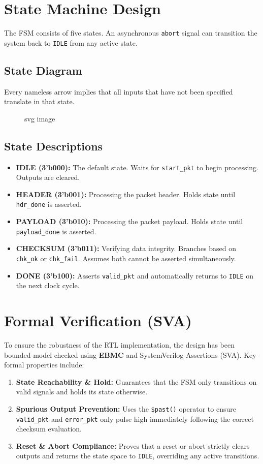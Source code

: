 \section{State Machine Design}
The FSM consists of five states. An asynchronous \texttt{abort} signal can transition the system back to \texttt{IDLE} from any active state. 

\subsection*{State Diagram}
Every nameless arrow implies that all inputs that have not been specified translate in that state.
\begin{figure}[htbp]
  \centering
  
  \caption{svg image}
\end{figure}

\subsection*{State Descriptions}
\begin{itemize}
    \item \textbf{IDLE (3'b000):} The default state. Waits for \texttt{start\_pkt} to begin processing. Outputs are cleared.
    \item \textbf{HEADER (3'b001):} Processing the packet header. Holds state until \texttt{hdr\_done} is asserted.
    \item \textbf{PAYLOAD (3'b010):} Processing the packet payload. Holds state until \texttt{payload\_done} is asserted.
    \item \textbf{CHECKSUM (3'b011):} Verifying data integrity. Branches based on \texttt{chk\_ok} or \texttt{chk\_fail}. Assumes both cannot be asserted simultaneously.
    \item \textbf{DONE (3'b100):} Asserts \texttt{valid\_pkt} and automatically returns to \texttt{IDLE} on the next clock cycle.
\end{itemize}

\section{Formal Verification (SVA)}
To ensure the robustness of the RTL implementation, the design has been bounded-model checked using \textbf{EBMC} and SystemVerilog Assertions (SVA). Key formal properties include:
\begin{enumerate}
    \item \textbf{State Reachability \& Hold:} Guarantees that the FSM only transitions on valid signals and holds its state otherwise.
    \item \textbf{Spurious Output Prevention:} Uses the \texttt{\$past()} operator to ensure \texttt{valid\_pkt} and \texttt{error\_pkt} only pulse high immediately following the correct checksum evaluation.
    \item \textbf{Reset \& Abort Compliance:} Proves that a reset or abort strictly clears outputs and returns the state space to \texttt{IDLE}, overriding any active transitions.
\end{enumerate}
